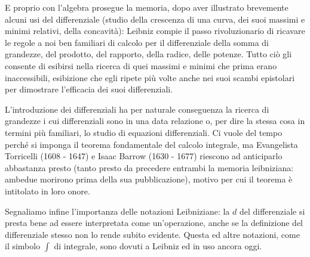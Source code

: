 \par E proprio con l'algebra prosegue la memoria, dopo aver illustrato brevemente alcuni usi del differenziale (studio della crescenza di una curva, dei suoi massimi e minimi relativi, della concavit\`a): Leibniz compie il passo rivoluzionario di ricavare le regole a noi ben familiari di calcolo per il differenziale della somma di grandezze, del prodotto, del rapporto, della radice, delle potenze. Tutto ci\`o gli consente di esibirsi nella ricerca di quei massimi e minimi che prima erano inaccessibili, esibizione che egli ripete pi\`u volte anche nei suoi scambi epistolari per dimostrare l'efficacia dei suoi differenziali.
\par L'introduzione dei differenziali ha per naturale conseguenza la ricerca di grandezze i cui differenziali sono in una data relazione o, per dire la stessa cosa in termini pi\`u familiari, lo studio di equazioni differenziali. Ci vuole del tempo perch\'e si imponga il teorema fondamentale del calcolo integrale, ma Evangelista Torricelli (1608 - 1647) e Isaac Barrow (1630 - 1677) riescono ad anticiparlo abbastanza presto (tanto presto da precedere entrambi la memoria leibniziana: ambedue morirono prima della sua pubblicazione), motivo per cui il teorema \`e intitolato in loro onore.
\par Segnaliamo infine l'importanza delle notazioni Leibniziane: la $d$ del differenziale si presta bene ad essere interpretata come un'operazione, anche se la definizione del differenziale stesso non lo rende subito evidente. Questa ed altre notazioni, come il simbolo $\int$ di integrale, sono dovuti a Leibniz ed in uso ancora oggi.
